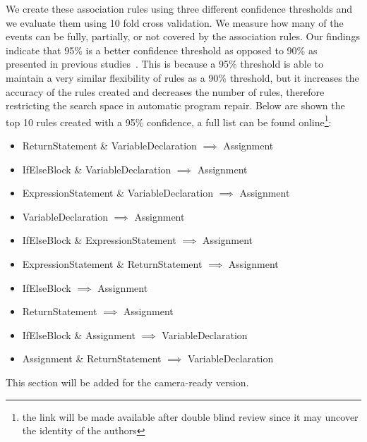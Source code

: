 \documentclass[sigconf]{acmart}
\begin{document}
We create these association rules using three different confidence thresholds and
we evaluate them using 10 fold cross validation. We measure how many of the events
can be fully, partially, or not covered by the association rules.
Our findings indicate that 95\% is a better confidence threshold as 
opposed to 90\% as presented in previous studies~\cite{Soto18}. This is because
a 95\% threshold is able to maintain a very similar flexibility of rules as a 90\%
threshold, but it increases the accuracy of the rules created and decreases the 
number of rules, therefore restricting the search space in automatic program repair.
Below are shown the top 10 rules created with a 95\% confidence, a full list can be 
found online\footnote{the link will be made available after double blind
review since it may uncover the identity of the authors}:
\begin{itemize}
 \item ReturnStatement \& VariableDeclaration $\implies$ Assignment
 \item IfElseBlock \& VariableDeclaration $\implies$ Assignment
 \item ExpressionStatement \& VariableDeclaration $\implies$ Assignment
 \item VariableDeclaration $\implies$ Assignment
 \item IfElseBlock \& ExpressionStatement $\implies$ Assignment
 \item ExpressionStatement \& ReturnStatement $\implies$ Assignment
 \item IfElseBlock $\implies$ Assignment
 \item ReturnStatement $\implies$ Assignment
 \item IfElseBlock \& Assignment $\implies$ VariableDeclaration
 \item Assignment \& ReturnStatement $\implies$ VariableDeclaration
 \end{itemize}


\begin{acks}
 This section will be added for the camera-ready version.

\end{acks}




\end{document}
